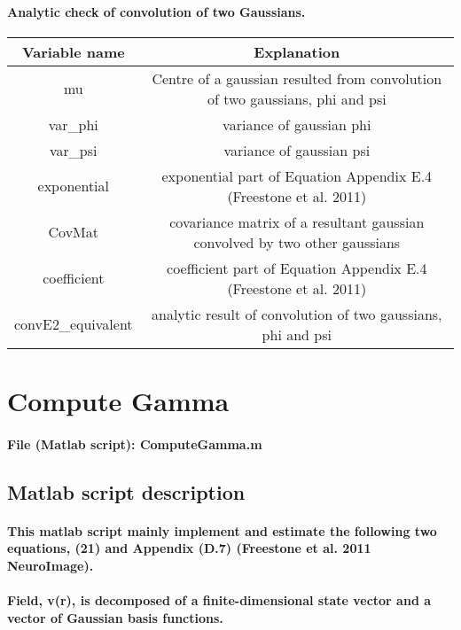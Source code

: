 \documentclass[a4paper, 8pt, english]{article}
\begin{document}
\paragraph{Analytic check of convolution of two Gaussians.\\}
\label{subp:Analytic check of convolution of two Gaussians}


\begin{tabular}{|c|c|}
\hline
Variable name & Explanation\tabularnewline
\hline
mu & Centre of a gaussian resulted from convolution of two gaussians, phi
and psi\tabularnewline
\hline
var\_phi & variance of gaussian phi\tabularnewline
\hline
var\_psi & variance of gaussian psi\tabularnewline
\hline
exponential & exponential part of Equation Appendix E.4 (Freestone et al. 2011)\tabularnewline
\hline
CovMat & covariance matrix of a resultant gaussian convolved by two other gaussians\tabularnewline
\hline
coefficient & coefficient part of Equation Appendix E.4 (Freestone et al. 2011)\tabularnewline
\hline
convE2\_equivalent & analytic result of convolution of two gaussians, phi and psi\tabularnewline
\hline
\end{tabular}

\section{Compute Gamma}

\paragraph{File (Matlab script): ComputeGamma.m}

\subsection*{Matlab script description}

\paragraph{This matlab script mainly implement and estimate the following two
equations, (21) and Appendix (D.7) (Freestone et al. 2011 NeuroImage).}

\paragraph{Field, v(r), is decomposed of a finite-dimensional state vector and
a vector of Gaussian basis functions.}
\end{document}
